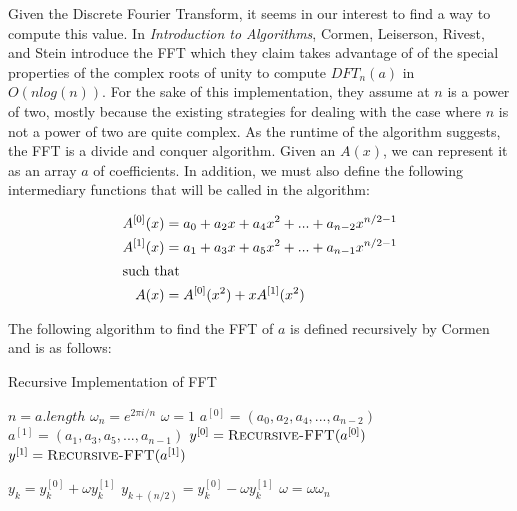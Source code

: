 \documentclass{amsproc}
\begin{document}
	Given the Discrete Fourier Transform, it seems in our interest to find a way to compute this value. In \textit{Introduction to Algorithms}, Cormen, Leiserson, Rivest, and Stein introduce the FFT which they claim takes advantage of of the special properties of the complex roots of unity to compute $DFT_n(a)$ in $O(nlog(n))$. For the sake of this implementation, they assume at $n$ is a power of two, mostly because the existing strategies for dealing with the case where $n$ is not a power of two are quite complex. As the runtime of the algorithm suggests, the FFT is a divide and conquer algorithm. Given an $A(x)$, we can represent it as an array $a$ of coefficients. In addition, we must also define the following intermediary functions that will be called in the algorithm:
	
\begin{align*}
A^{[0]}(x) &= a_0 + a_2x + a_4x^2 + ... + a_{n-2}x^{n/2 - 1} \\
A^{[1]}(x) &= a_1 + a_3x + a_5x^2 + ... + a_{n-1}x^{n/2 - 1} \\
\intertext{such that}
A(x) &= A^{[0]}(x^2) + xA^{[1]}(x^2)
\end{align*}

The following algorithm to find the FFT of $a$ is defined recursively by Cormen and is as follows:

\begin{algorithm}
\caption{Recursive Implementation of FFT}\label{fft}
\begin{algorithmic}[1]
 
\State $n = a.length$
  
\EndIf
\State $\omega_n = e^{2\pi i / n}$ 
\State $\omega = 1$
\State $a^{[0]} = (a_0, a_2, a_4, ..., a_{n-2})$ 
\State $a^{[1]} = (a_1, a_3, a_5, ..., a_{n-1})$
\State $y^{[0]} = \Call{Recursive-FFT}{a^{[0]}}$ 
\State $y^{[1]} = \Call{Recursive-FFT}{a^{[1]}}$

	\State $y_k = y_k^{[0]} + \omega y_k^{[1]}$ 
	\State $y_{k+(n/2)} = y_k^{[0]} - \omega y_k^{[1]}$
	\State $\omega = \omega \omega_n$ 
\EndFor

\State {} 

\EndProcedure
\end{algorithmic}
\end{algorithm}
\end{document}
